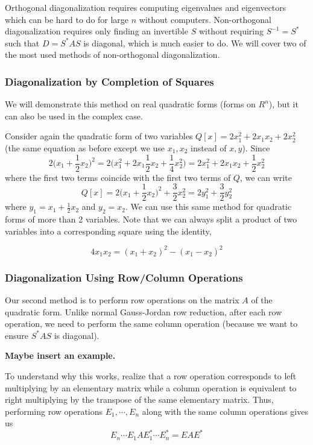 \documentclass[a4paper,10pt]{book}
\theoremstyle{plain}
\theoremstyle{plain}
\theoremstyle{definition}
\begin{document}
Orthogonal diagonalization requires computing eigenvalues and eigenvectors which can be hard to do for large $n$ without computers. Non-orthogonal diagonalization requires only finding an invertible $S$ without requiring $S^{-1} = S^{*}$ such that $D = S^{*}AS$ is diagonal, which is much easier to do. We will cover two of the most used methods of non-orthogonal diagonalization. 

\subsubsection{Diagonalization by Completion of Squares} 

We will demonstrate this method on real quadratic forms (forms on $
R^{n}$), but it can also be used in the complex case. 

Consider again the quadratic form of two variables $Q[x] = 2x_{1}^{2} + 2x_{1} x_{2} + 2x_{2}^{2}$ (the same equation as before except we use $x_{1}, x_{2}$ instead of $x, y$). Since 
$$2 \Big( x_{1} + \frac{1}{2} x_{2} \Big)^{2} = 2 \Big( x_{1}^{2} + 2 x_{1} \frac{1}{2} x_{2} + \frac{1}{4} x_{2}^{2} \Big) = 2x_{1}^{2} + 2x_{1}x_{2} + \frac{1}{2} x_{2}^{2}$$
where the first two terms coincide with the first two terms of $Q$, we can write 
$$Q[x] = 2 \Big( x_{1} + \frac{1}{2} x_{2} \Big)^{2} + \frac{3}{2} x_{2}^{2} = 2y_{1}^{2} + \frac{3}{2} y_{2}^{2}$$
where $y_{1} = x_{1} + \frac{1}{2} x_{2}$ and $y_{2} = x_{2}$. We can use this same method for quadratic forms of more than 2 variables. Note that we can always split a product of two variables into a corresponding square using the identity, 

$$4 x_{1} x_{2} = (x_{1} + x_{2})^{2} - (x_{1} - x_{2})^{2}$$

\subsubsection{Diagonalization Using Row/Column Operations}

Our second method is to perform row operations on the matrix $A$ of the quadratic form. Unlike normal Gauss-Jordan row reduction, after each row operation, we need to perform the same column operation (because we want to ensure $S^{*} AS$ is diagonal). 

\textbf{Maybe insert an example. }

To understand why this works, realize that a row operation corresponds to left multiplying by an elementary matrix while a column operation is equivalent to right multiplying by the transpose of the same elementary matrix. Thus, performing row operations $E_{1}, \cdots, E_{n}$ along with the same column operations gives us 
$$E_{n} \cdots E_{1} A E_{1}^{*} \cdots E_{n}^{*} = EAE^{*}$$
\end{document}

